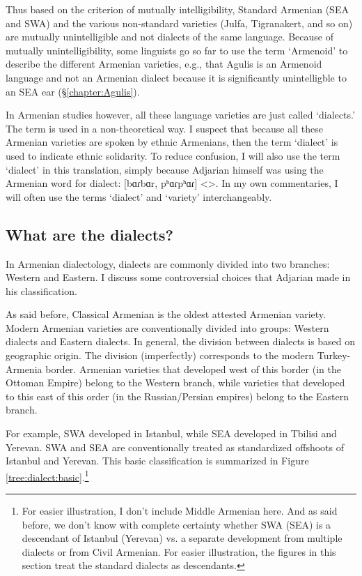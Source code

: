 Thus based on the criterion of mutually intelligibility, Standard Armenian (SEA and SWA) and the various non-standard varieties (Julfa, Tigranakert, and so on) are mutually unintelligible and not dialects of the same language. Because of mutually unintelligibility, some linguists go so far to use the term `Armenoid' to describe the different Armenian varieties, e.g., that Agulis is an Armenoid language \citep{Vaux-2008-ArmenianZok} and not an Armenian dialect because it is significantly unintelligble to an SEA ear (\S\ref{chapter:Agulis}). 

In Armenian studies however, all these language varieties are just called `dialects.'  The term is used in a non-theoretical way. I suspect that because all these Armenian varieties are spoken by ethnic Armenians, then the term `dialect' is used to indicate ethnic solidarity. To reduce confusion, I will also use the term `dialect' in this translation, simply because Adjarian himself was using the Armenian word for dialect: [bɑɾbɑr, pʰɑɾpʰɑɾ] <>. In my own commentaries, I will often use the terms `dialect' and `variety' interchangeably. 





\subsection{What are the dialects?}\label{sec:HossepIntro:armenian:whataredialect}

In Armenian dialectology, dialects are commonly divided into two branches: Western and Eastern. I discuss some controversial choices that Adjarian made in his classification. 


As said before, Classical Armenian is the oldest attested Armenian variety. Modern Armenian varieties are conventionally divided into groups: Western dialects and Eastern dialects. In general, the division between dialects is based on geographic origin. The division (imperfectly) corresponds to the modern Turkey-Armenia border. Armenian varieties that developed west of this border (in the Ottoman Empire) belong to the Western branch, while varieties that developed to this east of this order (in the Russian/Persian empires) belong to the Eastern branch. 

For example, SWA developed in Istanbul, while SEA developed in Tbilisi and Yerevan. SWA and SEA are conventionally treated as standardized offshoots of Istanbul and Yerevan. This basic classification is summarized in Figure \ref{tree:dialect:basic}.\footnote{For easier illustration, I don't include Middle Armenian here. And as said before, we don't know with complete certainty whether SWA (SEA) is a descendant of Istanbul (Yerevan) vs. a separate development from multiple dialects or from Civil Armenian. For easier illustration, the figures in this section treat the standard dialects as descendants.}

